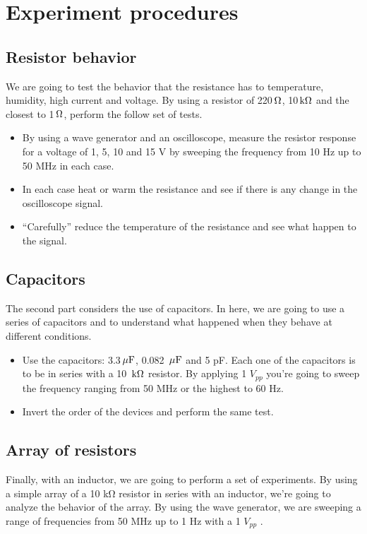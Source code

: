 \documentclass{article}
\newcommand{\unit}[1]{{\rm\,#1}}
\begin{document}
\section{Experiment procedures}

\subsection{Resistor behavior}
We are going to test the behavior that the resistance has to temperature, humidity, high current and voltage. By using a resistor of 220$\unit{\Omega}$, 10$\unit{k\Omega}$ and the closest to 1$\unit{\Omega}$, perform the follow set of tests.
\begin{itemize}
	\item  
	By using a wave generator and an oscilloscope, measure the resistor response for
a voltage of 1, 5, 10 and 15 V by sweeping the frequency from 10 Hz up to 50
MHz in each case.
	\item  
	In each case heat or warm the resistance and see if there is any change in the
oscilloscope signal.
	\item
	``Carefully'' reduce the temperature of the resistance and see what happen to the
signal.
\end{itemize}

\subsection{Capacitors}
The second part considers the use of capacitors. In here, we are going to use a series of
capacitors and to understand what happened when they behave at different conditions.

\begin{itemize}
	\item
	Use the capacitors: 3.3$\unit{\mu F}$, 0.082 $\unit{\mu F}$ and 5 pF. Each one of the capacitors is to be in series with a 10 $\unit{k\Omega}$ resistor. By applying 1 $V_{pp}$ you’re going to sweep the frequency ranging from 50 MHz or the highest to 60 Hz.
	\item
	Invert the order of the devices and perform the same test.
\end{itemize}

\subsection{Array of resistors}
Finally, with an inductor, we are going to perform a set of experiments. By using
a simple array of a 10 kΩ resistor in series with an inductor, we’re going to analyze
the behavior of the array. By using the wave generator, we are sweeping a range of
frequencies from 50 MHz up to 1 Hz with a 1 $V_{pp}$ .
\end{document}
